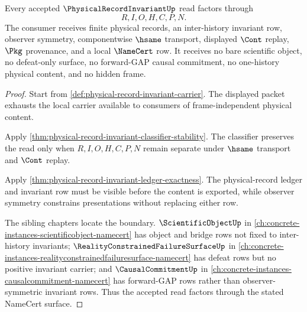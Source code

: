 \begin{theorem}
\label{thm:physical-record-invariant-namecert-surface}
Every accepted $\PhysicalRecordInvariantUp$ read factors through
$$
R,I,O,H,C,P,N.
$$
The consumer receives finite physical records, an inter-history invariant row, observer symmetry, componentwise $\hsame$ transport, displayed $\Cont$ replay, $\Pkg$ provenance, and a local $\NameCert$ row. It receives no bare scientific object, no defeat-only surface, no forward-GAP causal commitment, no one-history physical content, and no hidden frame.
\end{theorem}
\begin{proof}
Start from \autoref{def:physical-record-invariant-carrier}. The displayed packet exhausts the local carrier available to consumers of frame-independent physical content.

Apply \autoref{thm:physical-record-invariant-classifier-stability}. The classifier preserves the read only when $R,I,O,H,C,P,N$ remain separate under $\hsame$ transport and $\Cont$ replay.

Apply \autoref{thm:physical-record-invariant-ledger-exactness}. The physical-record ledger and invariant row must be visible before the content is exported, while observer symmetry constrains presentations without replacing either row.

The sibling chapters locate the boundary. $\ScientificObjectUp$ in \autoref{ch:concrete-instances-scientificobject-namecert} has object and bridge rows not fixed to inter-history invariants; $\RealityConstrainedFailureSurfaceUp$ in \autoref{ch:concrete-instances-realityconstrainedfailuresurface-namecert} has defeat rows but no positive invariant carrier; and $\CausalCommitmentUp$ in \autoref{ch:concrete-instances-causalcommitment-namecert} has forward-GAP rows rather than observer-symmetric invariant rows. Thus the accepted read factors through the stated NameCert surface.
\end{proof}

